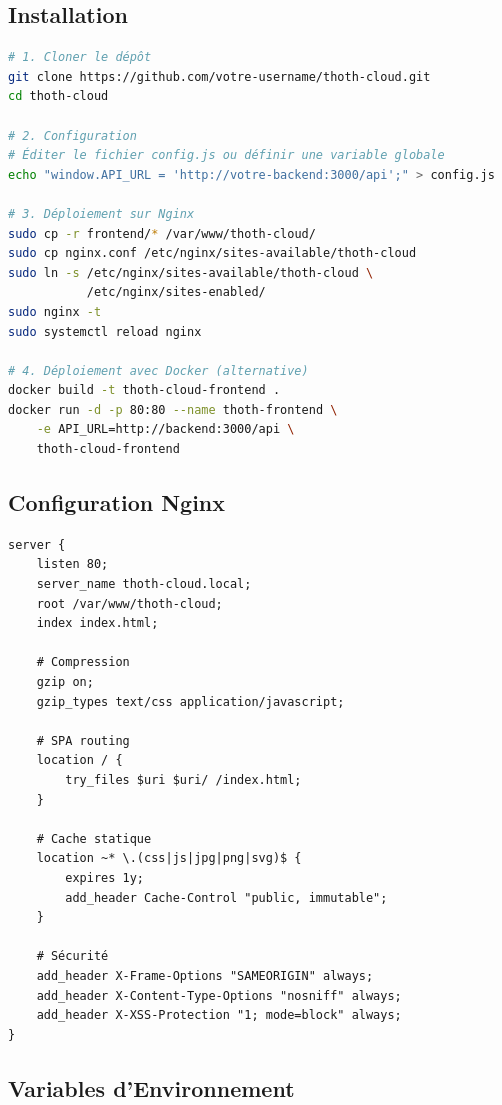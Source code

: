 \documentclass[12pt,a4paper]{article}
\begin{document}
\subsection{Installation}

\begin{lstlisting}[language=bash,caption=Déploiement frontend]
# 1. Cloner le dépôt
git clone https://github.com/votre-username/thoth-cloud.git
cd thoth-cloud

# 2. Configuration
# Éditer le fichier config.js ou définir une variable globale
echo "window.API_URL = 'http://votre-backend:3000/api';" > config.js

# 3. Déploiement sur Nginx
sudo cp -r frontend/* /var/www/thoth-cloud/
sudo cp nginx.conf /etc/nginx/sites-available/thoth-cloud
sudo ln -s /etc/nginx/sites-available/thoth-cloud \
           /etc/nginx/sites-enabled/
sudo nginx -t
sudo systemctl reload nginx

# 4. Déploiement avec Docker (alternative)
docker build -t thoth-cloud-frontend .
docker run -d -p 80:80 --name thoth-frontend \
    -e API_URL=http://backend:3000/api \
    thoth-cloud-frontend
\end{lstlisting}

\subsection{Configuration Nginx}

\begin{lstlisting}[language=nginx,caption=nginx.conf]
server {
    listen 80;
    server_name thoth-cloud.local;
    root /var/www/thoth-cloud;
    index index.html;

    # Compression
    gzip on;
    gzip_types text/css application/javascript;

    # SPA routing
    location / {
        try_files $uri $uri/ /index.html;
    }

    # Cache statique
    location ~* \.(css|js|jpg|png|svg)$ {
        expires 1y;
        add_header Cache-Control "public, immutable";
    }

    # Sécurité
    add_header X-Frame-Options "SAMEORIGIN" always;
    add_header X-Content-Type-Options "nosniff" always;
    add_header X-XSS-Protection "1; mode=block" always;
}
\end{lstlisting}

\subsection{Variables d'Environnement}
\end{document}
